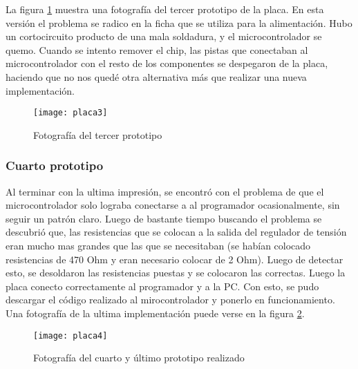 La figura \ref{fig:placa3} muestra una fotograf\'ia del tercer prototipo de la placa. En esta versi\'on el problema se radico en la ficha que se utiliza para la alimentaci\'on. Hubo un cortocircuito producto de una mala soldadura, y el microcontrolador se quemo. Cuando se intento remover el chip, las pistas que conectaban al microcontrolador con el resto de los componentes se despegaron de la placa, haciendo que no nos qued\'e otra alternativa m\'as que realizar una nueva implementaci\'on. 
\begin{figure}[h]
  \centering
  \texttt{[image: placa3]}
  \caption{\small Fotograf\'ia del tercer prototipo}\label{fig:placa3}
\end{figure}



\subsubsection{Cuarto prototipo} %
\label{ssub:cuarto_prototipo}

Al terminar con la ultima impresi\'on, se encontr\'o con el problema de que el microcontrolador solo lograba conectarse a al programador ocasionalmente, sin seguir un patr\'on claro. Luego de bastante tiempo buscando el problema se descubri\'o que, las resistencias que se colocan a la salida del regulador de tensi\'on eran mucho mas grandes que las que se necesitaban (se hab\'ian colocado resistencias de 470 Ohm y eran necesario colocar de 2 Ohm). Luego de detectar esto, se desoldaron las resistencias puestas y se colocaron las correctas. Luego la placa conecto correctamente al programador y a la PC. Con esto, se pudo descargar el c\'odigo realizado al mirocontrolador y ponerlo en funcionamiento. Una fotograf\'ia de la ultima implementaci\'on puede verse en la figura \ref{fig:placa4}.
\begin{figure}[h]
  \centering
  \texttt{[image: placa4]}
  \caption{\small Fotograf\'ia del cuarto y \'ultimo prototipo realizado}\label{fig:placa4}
\end{figure}



